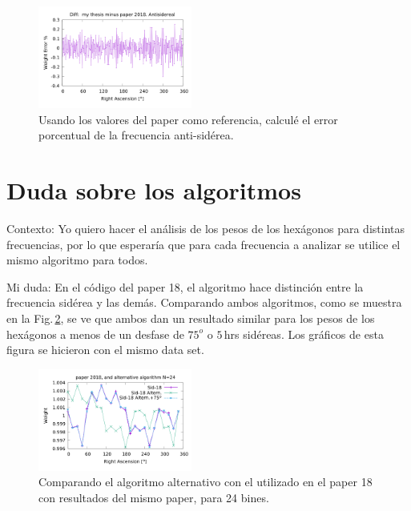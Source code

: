 \begin{figure}[H]
	\centering
	\includegraphics[width=0.45\textwidth]{anti_my_and_paper_in_360_error.png}
	\caption{Usando los valores del paper como referencia, calculé el error porcentual de la frecuencia anti-sidérea.}
	\label{fig:error_360_anti}
\end{figure}



\section{Duda sobre los algoritmos}

Contexto: Yo quiero hacer el análisis de los pesos de los hexágonos para distintas frecuencias, por lo que esperaría que para cada frecuencia a analizar se utilice el mismo algoritmo para todos.

Mi duda: En el código del paper 18, el algoritmo hace distinción entre la frecuencia sidérea y las demás. Comparando ambos algoritmos, como se muestra en la Fig.\,\ref{fig:alter_24}, se ve que ambos dan un resultado similar para los pesos de los hexágonos a menos de un desfase de $75^o$ o $5\,$hrs sidéreas. Los gráficos de esta figura se hicieron con el mismo data set.

\begin{figure}[H]
	\centering
	\includegraphics[width=0.45\textwidth]{sidereal_paper_in_24_w_alter.png}
	\caption{Comparando el algoritmo alternativo con el utilizado en el paper 18 con resultados del mismo paper, para 24 bines.}
	\label{fig:alter_24}
\end{figure}


